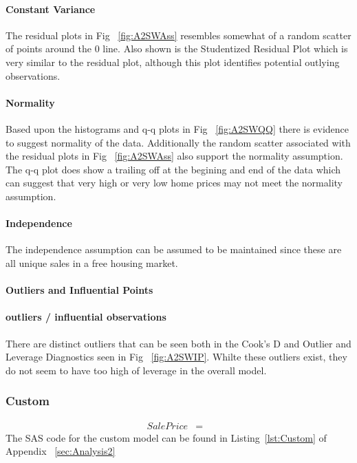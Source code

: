 \documentclass[11pt]{scrartcl} %
\begin{document}
\paragraph{Constant Variance} The residual plots in Fig ~\ref{fig:A2SWAss} resembles somewhat of a random scatter of points around the 0 line. Also shown is the Studentized Residual Plot which is very similar to the residual plot, although this plot identifies potential outlying observations.
\paragraph{Normality} Based upon the histograms and q-q plots in Fig ~\ref{fig:A2SWQQ} there is evidence to suggest normality of the data. Additionally the random scatter associated with the residual plots in Fig ~\ref{fig:A2SWAss} also support the normality assumption. The q-q plot does show a trailing off at the begining and end of the data which can suggest that very high or very low home prices may not meet the normality assumption.
\paragraph{Independence} The independence assumption can be assumed to be maintained since these are all unique sales in a free housing market. 
\paragraph{Outliers and Influential Points}
\paragraph{outliers / influential observations} There are distinct outliers that can be seen both in the Cook's D and Outlier and Leverage Diagnostics seen in Fig ~\ref{fig:A2SWIP}. Whilte these outliers exist, they do not seem to have too high of leverage in the overall model.

\subsubsection{Custom}
\begin{eqnarray*}
SalePrice &=& 
\end{eqnarray*}
The SAS code for the custom model can be found in Listing~\ref{lst:Custom} of Appendix ~\ref{sec:Analysis2}
\end{document}
